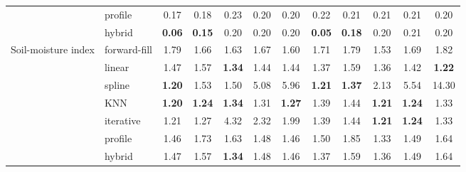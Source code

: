 \begin{table}[!ht]
\begin{tabular}{llccccc|ccccc}
 & profile & 0.17 & 0.18 & 0.23 & 0.20 & 0.20 & 0.22 & 0.21 & 0.21 & 0.21 & 0.20 \\
 & hybrid & \textbf{0.06} & \textbf{0.15} & 0.20 & 0.20 & 0.20 & \textbf{0.05} & \textbf{0.18} & 0.20 & 0.21 & 0.20 \\
\midrule
Soil-moisture index & forward-fill & 1.79 & 1.66 & 1.63 & 1.67 & 1.60 & 1.71 & 1.79 & 1.53 & 1.69 & 1.82 \\
 & linear & 1.47 & 1.57 & \textbf{1.34} & 1.44 & 1.44 & 1.37 & 1.59 & 1.36 & 1.42 & \textbf{1.22} \\
 & spline & \textbf{1.20} & 1.53 & 1.50 & 5.08 & 5.96 & \textbf{1.21} & \textbf{1.37} & 2.13 & 5.54 & 14.30 \\
 & KNN & \textbf{1.20} & \textbf{1.24} & \textbf{1.34} & 1.31 & \textbf{1.27} & 1.39 & 1.44 & \textbf{1.21} & \textbf{1.24} & 1.33 \\
 & iterative & 1.21 & 1.27 & 4.32 & 2.32 & 1.99 & 1.39 & 1.44 & \textbf{1.21} & \textbf{1.24} & 1.33 \\
 & profile & 1.46 & 1.73 & 1.63 & 1.48 & 1.46 & 1.50 & 1.85 & 1.33 & 1.49 & 1.64 \\
 & hybrid & 1.47 & 1.57 & \textbf{1.34} & 1.48 & 1.46 & 1.37 & 1.59 & 1.36 & 1.49 & 1.64 \\
\bottomrule
\end{tabular}
\end{table}
